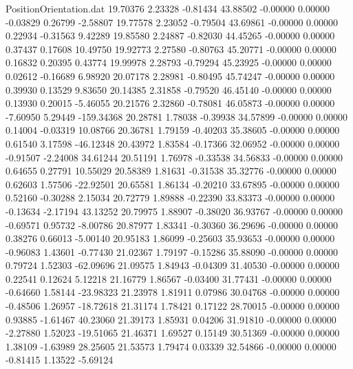 \begin{filecontents}{PositionOrientation.dat}
  19.70376    2.23328   -0.81434    43.88502   -0.00000    0.00000   -0.03829    0.26799   -2.58807
  19.77578    2.23052   -0.79504    43.69861   -0.00000    0.00000    0.22934   -0.31563    9.42289
  19.85580    2.24887   -0.82030    44.45265   -0.00000    0.00000    0.37437    0.17608   10.49750
  19.92773    2.27580   -0.80763    45.20771   -0.00000    0.00000    0.16832    0.20395    0.43774
  19.99978    2.28793   -0.79294    45.23925   -0.00000    0.00000    0.02612   -0.16689    6.98920
  20.07178    2.28981   -0.80495    45.74247   -0.00000    0.00000    0.39930    0.13529    9.83650
  20.14385    2.31858   -0.79520    46.45140   -0.00000    0.00000    0.13930    0.20015   -5.46055
  20.21576    2.32860   -0.78081    46.05873   -0.00000    0.00000   -7.60950    5.29449 -159.34368
  20.28781    1.78038   -0.39938    34.57899   -0.00000    0.00000    0.14004   -0.03319   10.08766
  20.36781    1.79159   -0.40203    35.38605   -0.00000    0.00000    0.61540    3.17598  -46.12348
  20.43972    1.83584   -0.17366    32.06952   -0.00000    0.00000   -0.91507   -2.24008   34.61244
  20.51191    1.76978   -0.33538    34.56833   -0.00000    0.00000    0.64655    0.27791   10.55029
  20.58389    1.81631   -0.31538    35.32776   -0.00000    0.00000    0.62603    1.57506  -22.92501
  20.65581    1.86134   -0.20210    33.67895   -0.00000    0.00000    0.52160   -0.30288    2.15034
  20.72779    1.89888   -0.22390    33.83373   -0.00000    0.00000   -0.13634   -2.17194   43.13252
  20.79975    1.88907   -0.38020    36.93767   -0.00000    0.00000   -0.69571    0.95732   -8.00786
  20.87977    1.83341   -0.30360    36.29696   -0.00000    0.00000    0.38276    0.66013   -5.00140
  20.95183    1.86099   -0.25603    35.93653   -0.00000    0.00000   -0.96083    1.43601   -0.77430
  21.02367    1.79197   -0.15286    35.88090   -0.00000    0.00000    0.79724    1.52303  -62.09696
  21.09575    1.84943   -0.04309    31.40530   -0.00000    0.00000    0.22541    0.12624    5.12218
  21.16779    1.86567   -0.03400    31.77431   -0.00000    0.00000   -0.64660    1.58144  -23.98323
  21.23978    1.81911    0.07986    30.04768   -0.00000    0.00000   -0.48506    1.26957  -18.72618
  21.31174    1.78421    0.17122    28.70015   -0.00000    0.00000    0.93885   -1.61467   40.23060
  21.39173    1.85931    0.04206    31.91810   -0.00000    0.00000   -2.27880    1.52023  -19.51065
  21.46371    1.69527    0.15149    30.51369   -0.00000    0.00000    1.38109   -1.63989   28.25605
  21.53573    1.79474    0.03339    32.54866   -0.00000    0.00000   -0.81415    1.13522   -5.69124

\end{filecontents}
